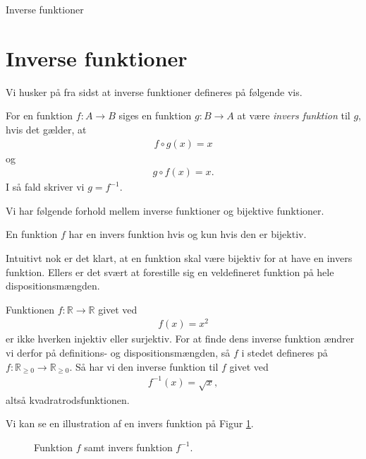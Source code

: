 



\begin{center}
\Huge
	Inverse funktioner 
\end{center}
\section*{Inverse funktioner}
Vi husker på fra sidst at inverse funktioner defineres på følgende vis. 
\begin{defn}
	For en funktion $f:A\to B$ siges en funktion $g:B\to A$ at være \textit{invers funktion} til $g$, hvis det gælder, 
	at 
	\begin{align*}
		f\circ g (x) = x
	\end{align*}
	og
	\begin{align*}
		g \circ f(x) = x.
	\end{align*}
	I så fald skriver vi $g = f^{-1}$.
\end{defn}

Vi har følgende forhold mellem inverse funktioner og bijektive funktioner.
\begin{setn}
	En funktion $f$ har en invers funktion hvis og kun hvis den er bijektiv. 
\end{setn}
Intuitivt nok er det klart, at en funktion skal være bijektiv for at have en invers funktion. Ellers er det svært at forestille sig en veldefineret funktion på hele dispositionsmængden.

\begin{exa}
	Funktionen $f:\mathbb{R} \to \mathbb{R}$ givet ved 
	\begin{align*}
		f(x) = x^2
	\end{align*}
	er ikke hverken injektiv eller surjektiv. For at finde dens inverse funktion ændrer vi derfor på
	definitions- og dispositionsmængden, så $f$ i stedet defineres på $f:\mathbb{R}_{\geq 0} \to 
	\mathbb{R}_{\geq 0}$. Så har vi den inverse funktion til $f$ givet ved
	\begin{align*}
		f^{-1}(x) = \sqrt{x},
	\end{align*}
	altså kvadratrodsfunktionen. 
\end{exa}

Vi kan se en illustration af en invers funktion på Figur \ref{fig:inv}. 
\begin{figure}[H]
	\centering
	\caption{Funktion $f$ samt invers funktion $f^{-1}$.}
	\label{fig:inv}
\end{figure}

